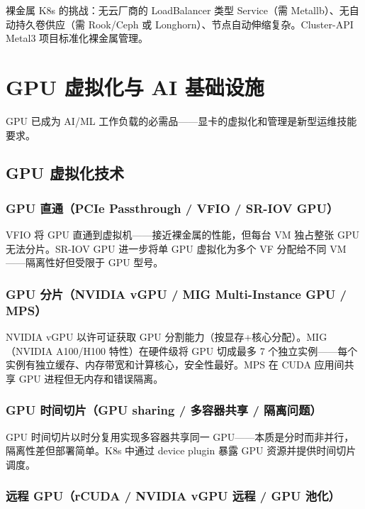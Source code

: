 \documentclass[12pt,UTF8]{ctexbook}
\begin{document}
裸金属 K8s 的挑战：无云厂商的 LoadBalancer 类型 Service（需 Metallb）、无自动持久卷供应（需 Rook/Ceph 或 Longhorn）、节点自动伸缩复杂。Cluster-API Metal3 项目标准化裸金属管理。


\chapter{GPU 虚拟化与 AI 基础设施}
\label{chap:gpu-virtualization}

GPU 已成为 AI/ML 工作负载的必需品——显卡的虚拟化和管理是新型运维技能要求。

  \section{GPU 虚拟化技术}
    \subsection{GPU 直通（PCIe Passthrough / VFIO / SR-IOV GPU）}

VFIO 将 GPU 直通到虚拟机——接近裸金属的性能，但每台 VM 独占整张 GPU 无法分片。SR-IOV GPU 进一步将单 GPU 虚拟化为多个 VF 分配给不同 VM——隔离性好但受限于 GPU 型号。

    \subsection{GPU 分片（NVIDIA vGPU / MIG Multi-Instance GPU / MPS）}

NVIDIA vGPU 以许可证获取 GPU 分割能力（按显存+核心分配）。MIG（NVIDIA A100/H100 特性）在硬件级将 GPU 切成最多 7 个独立实例——每个实例有独立缓存、内存带宽和计算核心，安全性最好。MPS 在 CUDA 应用间共享 GPU 进程但无内存和错误隔离。

    \subsection{GPU 时间切片（GPU sharing / 多容器共享 / 隔离问题）}

GPU 时间切片以时分复用实现多容器共享同一 GPU——本质是分时而非并行，隔离性差但部署简单。K8s 中通过 device plugin 暴露 GPU 资源并提供时间切片调度。

    \subsection{远程 GPU（rCUDA / NVIDIA vGPU 远程 / GPU 池化）}
\end{document}
